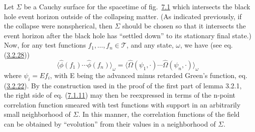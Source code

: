 \documentclass[11pt,a4paper]{article}
\begin{document}
Let \(\Sigma\) be a Cauchy surface for the spacetime of fig.~\hyperref[fig:7.1]{7.1} which intersects the black hole event horizon outside of the collapsing matter. (As indicated previously, if the collapse were nonspherical, then \(\Sigma\) should be chosen so that it intersects the event horizon after the black hole has ``settled down'' to its stationary final state.) Now, for any test functions \(f_1, \ldots, f_n \in \mathcal{T}\), and any state, \(\omega\), we have (see eq. (\hyperref[eq:3.2.28]{3.2.28}))
\begin{equation*}
\langle \hat{\phi}(f_1) \cdots \hat{\phi}(f_n) \rangle_{\omega} = \langle \hat{\Omega}(\psi_1, \cdot) \cdots \hat{\Omega}(\psi_n, \cdot) \rangle_{\omega} \tag{7.1.11}\label{eq:7.1.11}
\end{equation*}
where \(\psi_i = Ef_i\), with E being the advanced minus retarded Green's function, eq. (\hyperref[eq:3.2.22]{3.2.22}). By the construction used in the proof of the first part of lemma 3.2.1, the right side of eq. (\hyperref[eq:7.1.11]{7.1.11}) may then be \hypertarget{source-173}{} reexpressed in terms of the n-point correlation function smeared with test functions with support in an arbitrarily small neighborhood of \(\Sigma\). In this manner, the correlation functions of the field can be obtained by ``evolution'' from their values in a neighborhood of \(\Sigma\).
\end{document}

